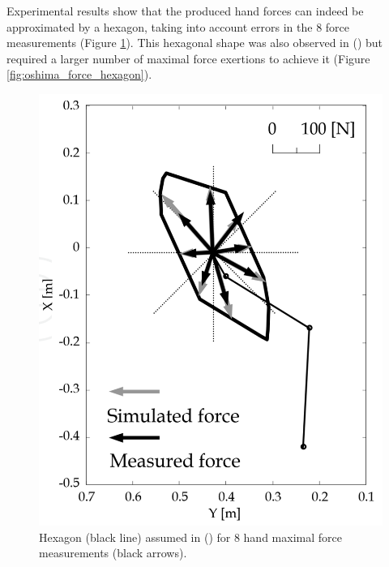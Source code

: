 Experimental results show that the produced hand forces can indeed be approximated by a hexagon, taking into account errors in the 8 force measurements (Figure \ref{fig:sasaki_hexagon}). This hexagonal shape was also observed in (\cite{oshimaRoboticAnalysesOutput2000}) but required a larger number of maximal force exertions to achieve it (Figure \ref{fig:oshima_force_hexagon}).
\begin{figure}[!htb]
    \captionsetup{justification=centering}
    \begin{minipage}{0.5\linewidth}
        \centering
        \includegraphics[trim={0 0 0 0},clip,width=0.8\linewidth]{img/chapter_1/sasaki_hexagon.png}
        \caption{Hexagon (black line) assumed in (\cite{sasakiHigherDimensionalSpatial2010a}) for 8 hand maximal force measurements (black arrows).}
        \label{fig:sasaki_hexagon}
    \end{minipage}
    \hfill
    \begin{minipage}{0.48\linewidth}
        \centering

\end{minipage}
\end{figure}
